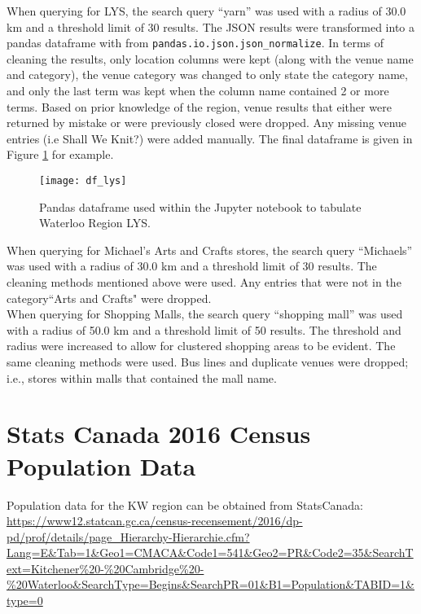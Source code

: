 \documentclass[10pt,a4paper]{report}
\begin{document}
	\noindent When querying for LYS, the search query ``yarn'' was used with a radius of 30.0 km and a threshold limit of 30 results. The JSON results were transformed into a pandas dataframe with from \texttt{pandas.io.json.json\_normalize}. In terms of cleaning the results, only location columns were kept (along with the venue name and category), the venue category was changed to only state the category name, and only the last term was kept when the column name contained 2 or more terms. Based on prior knowledge of the region, venue results that either were returned by mistake or were previously closed were dropped. Any missing venue entries  (i.e Shall We Knit?) were added manually. The final dataframe is given in Figure \ref{fig:dflys} for example.

	\begin{figure} [h!]
		\centering
		\texttt{[image: df\_lys]}
		\caption{Pandas dataframe used within the Jupyter notebook to tabulate Waterloo Region LYS.}
		\label{fig:dflys}
	\end{figure}
	
	When querying for Michael's Arts and Crafts stores, the search query ``Michaels'' was used with a radius of 30.0 km and a threshold limit of 30 results. The cleaning methods mentioned above were used. Any entries that were not in the category``Arts and Crafts" were dropped.\\

	\noindent When querying for Shopping Malls, the search query ``shopping mall'' was used with a radius of 50.0 km and a threshold limit of 50 results. The threshold and radius were increased to allow for clustered shopping areas to be evident. The same cleaning methods were used. Bus lines and duplicate venues were dropped; i.e., stores within malls that contained the mall name.

	
	\section{Stats Canada 2016 Census Population Data}
	Population data for the KW region can be obtained from StatsCanada:\\
	
	\noindent \url{https://www12.statcan.gc.ca/census-recensement/2016/dp-pd/prof/details/page\_Hierarchy-Hierarchie.cfm?Lang=E\&Tab=1\&Geo1=CMACA\&Code1=541\&Geo2=PR\&Code2=35\&SearchText=Kitchener\%20-\%20Cambridge\%20-\%20Waterloo\&SearchType=Begins\&SearchPR=01\&B1=Population\&TABID=1\&type=0}\\
	
\end{document}
